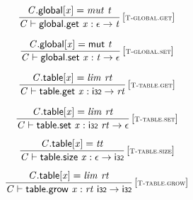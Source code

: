 \vspace{1ex}

$$
\begin{array}{@{}c@{}}\displaystyle
\frac{
{\mathit{C}}.\mathsf{global}{}[{\mathit{x}}] = {\mathit{mut}}~{\mathit{t}}
}{
{\mathit{C}} \vdash \mathsf{global.get}~{\mathit{x}} : \epsilon \rightarrow {\mathit{t}}
} \, {[\textsc{\scriptsize T{-}global.get}]}
\qquad
\end{array}
$$

$$
\begin{array}{@{}c@{}}\displaystyle
\frac{
{\mathit{C}}.\mathsf{global}{}[{\mathit{x}}] = \mathsf{mut}~{\mathit{t}}
}{
{\mathit{C}} \vdash \mathsf{global.set}~{\mathit{x}} : {\mathit{t}} \rightarrow \epsilon
} \, {[\textsc{\scriptsize T{-}global.set}]}
\qquad
\end{array}
$$

\vspace{1ex}

$$
\begin{array}{@{}c@{}}\displaystyle
\frac{
{\mathit{C}}.\mathsf{table}{}[{\mathit{x}}] = {\mathit{lim}}~{\mathit{rt}}
}{
{\mathit{C}} \vdash \mathsf{table.get}~{\mathit{x}} : \mathsf{i{\scriptstyle32}} \rightarrow {\mathit{rt}}
} \, {[\textsc{\scriptsize T{-}table.get}]}
\qquad
\end{array}
$$

$$
\begin{array}{@{}c@{}}\displaystyle
\frac{
{\mathit{C}}.\mathsf{table}{}[{\mathit{x}}] = {\mathit{lim}}~{\mathit{rt}}
}{
{\mathit{C}} \vdash \mathsf{table.set}~{\mathit{x}} : \mathsf{i{\scriptstyle32}}~{\mathit{rt}} \rightarrow \epsilon
} \, {[\textsc{\scriptsize T{-}table.set}]}
\qquad
\end{array}
$$

$$
\begin{array}{@{}c@{}}\displaystyle
\frac{
{\mathit{C}}.\mathsf{table}{}[{\mathit{x}}] = {\mathit{tt}}
}{
{\mathit{C}} \vdash \mathsf{table.size}~{\mathit{x}} : \epsilon \rightarrow \mathsf{i{\scriptstyle32}}
} \, {[\textsc{\scriptsize T{-}table.size}]}
\qquad
\end{array}
$$

$$
\begin{array}{@{}c@{}}\displaystyle
\frac{
{\mathit{C}}.\mathsf{table}{}[{\mathit{x}}] = {\mathit{lim}}~{\mathit{rt}}
}{
{\mathit{C}} \vdash \mathsf{table.grow}~{\mathit{x}} : {\mathit{rt}}~\mathsf{i{\scriptstyle32}} \rightarrow \mathsf{i{\scriptstyle32}}
} \, {[\textsc{\scriptsize T{-}table.grow}]}
\qquad
\end{array}
$$

